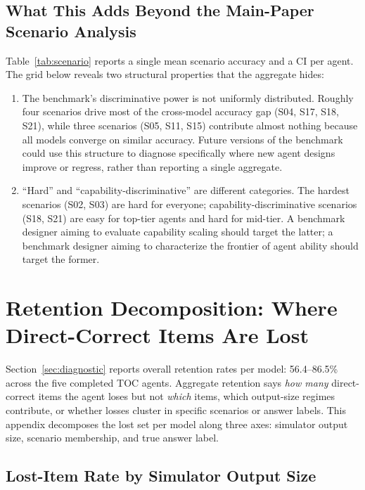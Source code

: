 \documentclass{article}
\begin{document}
\subsection{What This Adds Beyond the Main-Paper Scenario Analysis}

Table~\ref{tab:scenario} reports a single mean scenario accuracy and a CI per agent. The grid below reveals two structural properties that the aggregate hides:

\begin{enumerate}[leftmargin=*, itemsep=2pt]
    \item The benchmark's discriminative power is not uniformly distributed. Roughly four scenarios drive most of the cross-model accuracy gap (S04, S17, S18, S21), while three scenarios (S05, S11, S15) contribute almost nothing because all models converge on similar accuracy. Future versions of the benchmark could use this structure to diagnose specifically where new agent designs improve or regress, rather than reporting a single aggregate.
    \item ``Hard'' and ``capability-discriminative'' are different categories. The hardest scenarios (S02, S03) are hard for everyone; capability-discriminative scenarios (S18, S21) are easy for top-tier agents and hard for mid-tier. A benchmark designer aiming to evaluate capability scaling should target the latter; a benchmark designer aiming to characterize the frontier of agent ability should target the former.
\end{enumerate}

\section{Retention Decomposition: Where Direct-Correct Items Are Lost}
\label{sec:appendix-retention-decomp}

Section~\ref{sec:diagnostic} reports overall retention rates per model: 56.4--86.5\% across the five completed TOC agents. Aggregate retention says \emph{how many} direct-correct items the agent loses but not \emph{which} items, which output-size regimes contribute, or whether losses cluster in specific scenarios or answer labels. This appendix decomposes the lost set per model along three axes: simulator output size, scenario membership, and true answer label.

\subsection{Lost-Item Rate by Simulator Output Size}
\label{sec:appendix-lost-by-bin}
\end{document}
